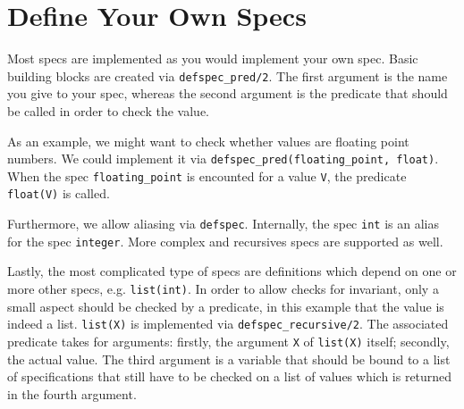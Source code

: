\documentclass{article}
\begin{document}
\section{Define Your Own Specs}

Most specs are implemented as you would implement your own spec.
Basic building blocks are created via \verb|defspec_pred/2|.
The first argument is the name you give to your spec,
whereas the second argument is the predicate
that should be called in order to check the value.

As an example, we might want to check whether values are floating point numbers.
We could implement it via \verb|defspec_pred(floating_point, float)|.
When the spec \verb|floating_point| is encounted for a value \verb|V|,
the predicate \verb|float(V)| is called.


Furthermore, we allow aliasing via \verb|defspec|.
Internally, the spec \verb|int| is an alias for the spec \verb|integer|.
More complex and recursives specs are supported as well.


Lastly, the most complicated type of specs are
definitions which depend on one or more other specs,
e.g. \verb|list(int)|.
In order to allow checks for invariant,
only a small aspect should be checked by a predicate,
in this example that the value is indeed a list.
\verb|list(X)| is implemented via \verb|defspec_recursive/2|.
The associated predicate takes for arguments:
firstly, the argument \verb|X| of \verb|list(X)| itself;
secondly, the actual value.
The third argument is a variable that should be bound to a list
of specifications that still have to be checked on
a list of values which is returned in the fourth argument.




%
%
\end{document}
